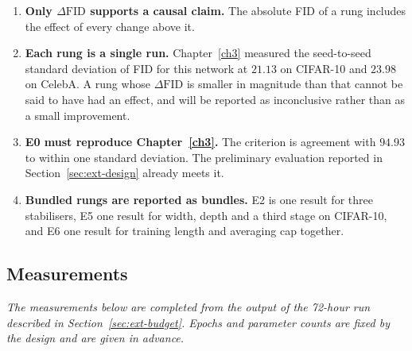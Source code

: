 \begin{enumerate}
    \item \textbf{Only $\Delta\mathrm{FID}$ supports a causal claim.} The absolute FID of a rung
    includes the effect of every change above it.

    \item \textbf{Each rung is a single run.} Chapter~\ref{ch3} measured the seed-to-seed standard
    deviation of FID for this network at $21.13$ on CIFAR-10 and $23.98$ on CelebA. A rung whose
    $\Delta\mathrm{FID}$ is smaller in magnitude than that cannot be said to have had an effect, and
    will be reported as inconclusive rather than as a small improvement.

    \item \textbf{E0 must reproduce Chapter~\ref{ch3}.} The criterion is agreement with $94.93$ to
    within one standard deviation. The preliminary evaluation reported in Section~\ref{sec:ext-design}
    already meets it.

    \item \textbf{Bundled rungs are reported as bundles.} E2 is one result for three stabilisers,
    E5 one result for width, depth and a third stage on CIFAR-10, and E6 one result for training
    length and averaging cap together.
\end{enumerate}

\subsection{Measurements}

\noindent\textit{The measurements below are completed from the output of the 72-hour run described
in Section~\ref{sec:ext-budget}. Epochs and parameter counts are fixed by the design and are given
in advance.}

